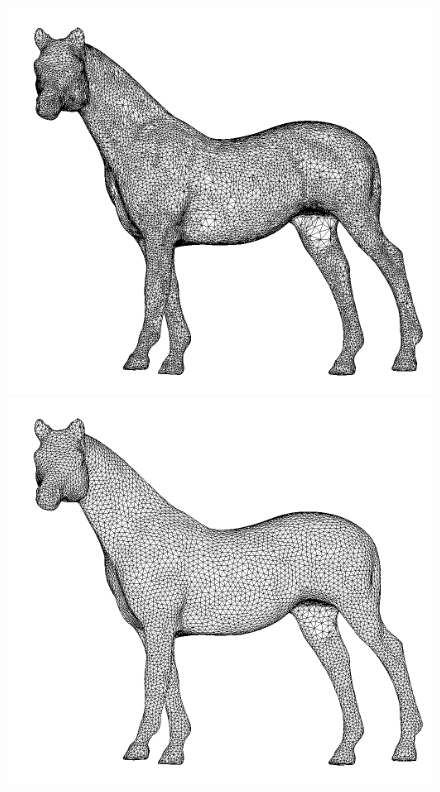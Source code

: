 \documentclass[letter,11pt]{article}
\begin{document}

\begin{figure}
  \centering
  \begin{minipage}{1\textwidth}
    \centering
    \includegraphics[width=0.50\linewidth]{../image/horse_0.png}
  \end{minipage} 
  \begin{minipage}{0.40\textwidth}
    \centering
    \includegraphics[width=1\linewidth]{../image/horse_a.png}
  \end{minipage}
  \begin{minipage}{.40\textwidth}
    \centering

\end{minipage}
\end{figure}
\end{document}

